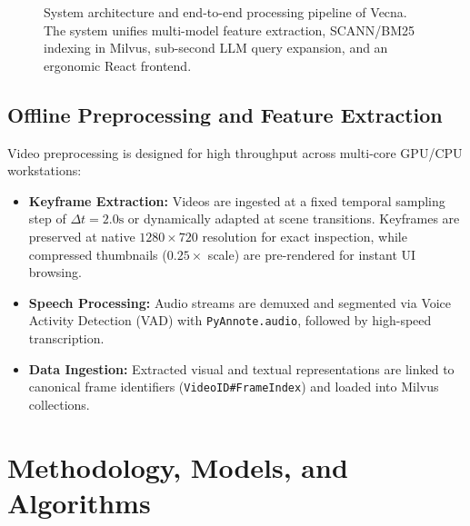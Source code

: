 \documentclass[10pt,a4paper,twocolumn]{article}
\begin{document}
\begin{figure}[t]
\caption{System architecture and end-to-end processing pipeline of Vecna. The system unifies multi-model feature extraction, SCANN/BM25 indexing in Milvus, sub-second LLM query expansion, and an ergonomic React frontend.}
\label{fig:architecture}
\vspace{-0.2cm}
\end{figure}

\subsection{Offline Preprocessing and Feature Extraction}
Video preprocessing is designed for high throughput across multi-core GPU/CPU workstations:
\begin{itemize}
    \item \textbf{Keyframe Extraction:} Videos are ingested at a fixed temporal sampling step of $\Delta t = 2.0\text{s}$ or dynamically adapted at scene transitions. Keyframes are preserved at native $1280 \times 720$ resolution for exact inspection, while compressed thumbnails ($0.25\times$ scale) are pre-rendered for instant UI browsing.
    \item \textbf{Speech Processing:} Audio streams are demuxed and segmented via Voice Activity Detection (VAD) with \texttt{PyAnnote.audio}, followed by high-speed transcription.
    \item \textbf{Data Ingestion:} Extracted visual and textual representations are linked to canonical frame identifiers (\texttt{VideoID\#FrameIndex}) and loaded into Milvus collections.
\end{itemize}

\section{Methodology, Models, and Algorithms}
\end{document}

